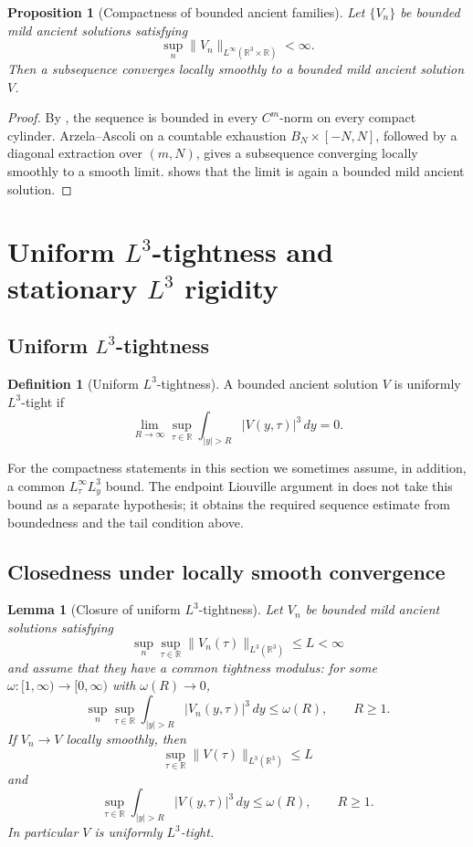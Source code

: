 \documentclass[11pt]{amsart}
\theoremstyle{plain}
\newtheorem{lemma}[lemma]{Lemma}
\newtheorem{proposition}[proposition]{Proposition}
\theoremstyle{definition}
\newtheorem{definition}[definition]{Definition}
\theoremstyle{remark}
\numberwithin{equation}{section}
\newcommand{\R}{\mathbb R}
\begin{document}
\begin{proposition}[Compactness of bounded ancient families]
\label{p2:prop:bounded-compactness}
Let \(\{V_n\}\) be bounded mild ancient solutions satisfying
\[
   \sup_n\|V_n\|_{L^\infty(\R^3\times\R)}<\infty .
\]
Then a subsequence converges locally smoothly to a bounded mild ancient
solution \(V\).
\end{proposition}

\begin{proof}
By , the sequence is bounded in every
\(C^m\)-norm on every compact cylinder.  Arzela--Ascoli on a countable
exhaustion \(B_N\times[-N,N]\), followed by a diagonal extraction over
\((m,N)\), gives a subsequence converging locally smoothly to a smooth limit.
 shows that the limit is again a bounded mild ancient
solution.
\end{proof}

\section{\texorpdfstring{Uniform \(L^3\)-tightness and stationary \(L^3\) rigidity}{Uniform L3-tightness and stationary L3 rigidity}}
\label{p2:sec:tightness-rigidity}

\subsection{\texorpdfstring{Uniform \(L^3\)-tightness}{Uniform L3-tightness}}

\begin{definition}[Uniform \(L^3\)-tightness]\label{p2:def:L3-tight}
A bounded ancient solution \(V\) is uniformly \(L^3\)-tight if
\[
   \lim_{R\to\infty}
   \sup_{\tau\in\R}
   \int_{|y|>R}|V(y,\tau)|^3\,dy=0 .
\]
\end{definition}

For the compactness statements in this section we sometimes assume, in
addition, a common \(L^\infty_\tau L^3_y\) bound.  The endpoint Liouville
argument in  does not take this bound as a
separate hypothesis; it obtains the required sequence estimate from boundedness
and the tail condition above.

\subsection{Closedness under locally smooth convergence}

\begin{lemma}[Closure of uniform \(L^3\)-tightness]\label{p2:lem:tight-closure}
Let \(V_n\) be bounded mild ancient solutions satisfying
\[
   \sup_n\sup_{\tau\in\R}\|V_n(\tau)\|_{L^3(\R^3)}\le L<\infty
\]
and assume that they have a common tightness modulus: for some
\(\omega:[1,\infty)\to[0,\infty)\) with \(\omega(R)\to0\),
\[
   \sup_n\sup_{\tau\in\R}
   \int_{|y|>R}|V_n(y,\tau)|^3\,dy\le \omega(R),
   \qquad R\ge1.
\]
If \(V_n\to V\) locally smoothly, then
\[
   \sup_{\tau\in\R}\|V(\tau)\|_{L^3(\R^3)}\le L
\]
and
\[
   \sup_{\tau\in\R}
   \int_{|y|>R}|V(y,\tau)|^3\,dy\le \omega(R),
   \qquad R\ge1.
\]
In particular \(V\) is uniformly \(L^3\)-tight.
\end{lemma}
\end{document}
